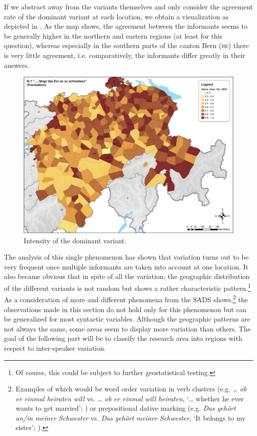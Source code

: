 \documentclass[output=paper]{LSP/langsci}
\begin{document}
If we abstract away from the variants themselves and only consider the agreement rate of the dominant variant at each location, we obtain a visualization as depicted in . As the map shows, the agreement between the informants seems to be generally higher in the northern and eastern regions (at least for this question), whereas especially in the southern parts of the canton Bern (\textsc{be}) there is very little agreement, i.e. comparatively, the informants differ greatly in their answers.
  
\begin{figure}
\includegraphics[width=\textwidth]{illustrations/stoeck_fig4}
\caption{Intensity of the dominant variant.}
\label{fig:stoeck:4}
\end{figure}
 
The analysis of this single phenomenon has shown that variation turns out to be very frequent once multiple informants are taken into account at one location. It also became obvious that in spite of all the variation, the geographic distribution of the different variants is not random but shows a rather characteristic pattern.\footnote{ Of course, this could be subject to further geostatistical testing.} As a consideration of more and different phenomena from the SADS shows,\footnote{ Examples of which would be word order variation in verb clusters (e.g. \emph{… ob er einmal heiraten will} vs. \emph{… ob er einmal will heiraten}, ‘… whether he ever wants to get married’; \citealt{seiler_three_2004}) or prepositional dative marking (e.g. \emph{Das gehört an/in meiner Schwester} vs. \emph{Das gehört meiner Schwester}, ‘It belongs to my sister’; \citealt{seiler_prapositionale_2003}).} the observations made in this section do not hold only for this phenomenon but can be generalized for most syntactic variables. Although the geographic patterns are not always the same, some areas seem to display more variation than others. The goal of the following part will be to classify the research area into regions with respect to inter-speaker variation.
\end{document}

